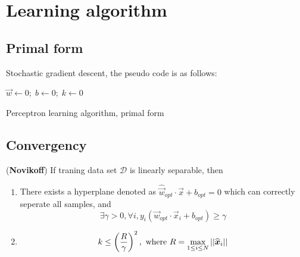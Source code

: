 \section{Learning algorithm}
\subsection{Primal form}
Stochastic gradient descent, the pseudo code is as follows:
\begin{algorithm}[htbp]
    \SetAlgoNoLine
  
    $\vec{w} \leftarrow 0;\; b \leftarrow 0;\; k \leftarrow 0$\;
\caption{Perceptron learning algorithm, primal form}
\end{algorithm}

\subsection{Convergency}
\begin{theorem}
(\textbf{Novikoff}) If traning data set $\mathcal{D}$ is linearly separable, then
\begin{enumerate}
\item There exists a hyperplane denoted as $\widehat{\vec{w}}_{opt} \cdot \vec{x}+b_{opt}=0$ which can correctly seperate all samples, and 
\begin{equation}
\exists\gamma>0,\forall i, y_i(\vec{w}_{opt} \cdot \vec{x}_i+b_{opt}) \geq \gamma
\end{equation}
\item \begin{equation}k \leq \left(\dfrac{R}{\gamma}\right)^2,\text{ where } R=\max\limits_{1 \leq i \leq N} \abs{\abs{\widehat{\vec{x}}_i}}
\end{equation}

\end{enumerate}
\end{theorem}

